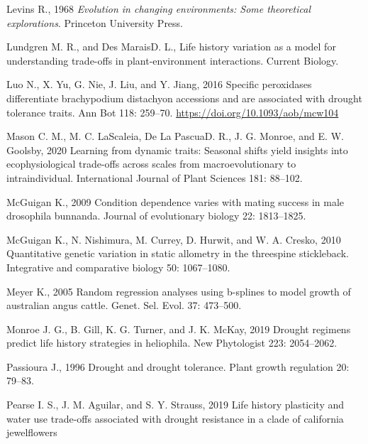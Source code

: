 \documentclass[jou,floatsintext]{apa6}
\begin{document}
\leavevmode\hypertarget{ref-levins1968evolution}{}%
Levins R., 1968 \emph{Evolution in changing environments: Some theoretical explorations}. Princeton University Press.

\leavevmode\hypertarget{ref-lundgren2020lifehistory}{}%
Lundgren M. R., and Des MaraisD. L., Life history variation as a model for understanding trade-offs in plant-environment interactions. Current Biology.

\leavevmode\hypertarget{ref-luo2016specific}{}%
Luo N., X. Yu, G. Nie, J. Liu, and Y. Jiang, 2016 Specific peroxidases differentiate brachypodium distachyon accessions and are associated with drought tolerance traits. Ann Bot 118: 259--70. \url{https://doi.org/10.1093/aob/mcw104}

\leavevmode\hypertarget{ref-mason2020learning}{}%
Mason C. M., M. C. LaScaleia, De La PascuaD. R., J. G. Monroe, and E. W. Goolsby, 2020 Learning from dynamic traits: Seasonal shifts yield insights into ecophysiological trade-offs across scales from macroevolutionary to intraindividual. International Journal of Plant Sciences 181: 88--102.

\leavevmode\hypertarget{ref-mcguigan2009condition}{}%
McGuigan K., 2009 Condition dependence varies with mating success in male drosophila bunnanda. Journal of evolutionary biology 22: 1813--1825.

\leavevmode\hypertarget{ref-mcguigan2010quantitative}{}%
McGuigan K., N. Nishimura, M. Currey, D. Hurwit, and W. A. Cresko, 2010 Quantitative genetic variation in static allometry in the threespine stickleback. Integrative and comparative biology 50: 1067--1080.

\leavevmode\hypertarget{ref-meyer2005randomregression}{}%
Meyer K., 2005 Random regression analyses using b-splines to model growth of australian angus cattle. Genet. Sel. Evol. 37: 473--500.

\leavevmode\hypertarget{ref-monroe2019drought}{}%
Monroe J. G., B. Gill, K. G. Turner, and J. K. McKay, 2019 Drought regimens predict life history strategies in heliophila. New Phytologist 223: 2054--2062.

\leavevmode\hypertarget{ref-passioura1996drought}{}%
Passioura J., 1996 Drought and drought tolerance. Plant growth regulation 20: 79--83.

\leavevmode\hypertarget{ref-pearse2019life}{}%
Pearse I. S., J. M. Aguilar, and S. Y. Strauss, 2019 Life history plasticity and water use trade-offs associated with drought resistance in a clade of california jewelflowers
\end{document}
